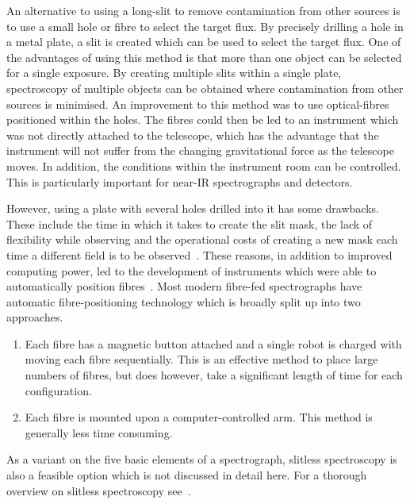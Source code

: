 An alternative to using a long-slit to remove contamination from other sources is to use a small hole or fibre to select the target flux.
By precisely drilling a hole in a metal plate, a slit is created which can be used to select the target flux.
One of the advantages of using this method is that more than one object can be selected for a single exposure.
By creating multiple slits within a single plate, spectroscopy of multiple objects can be obtained where contamination from other sources is minimised.
An improvement to this method was to use optical-fibres positioned within the holes.
The fibres could then be led to an instrument which was not directly attached to the telescope, which has the advantage that the instrument will not suffer from the changing gravitational force as the telescope moves.
In addition, the conditions within the instrument room can be controlled.
This is particularly important for near-IR spectrographs and detectors.

However, using a plate with several holes drilled into it has some drawbacks.
These include the time in which it takes to create the slit mask, the lack of flexibility while observing and the operational costs of creating a new mask each time a different field is to be observed~\citep{1986SPIE..627..118P}.
These reasons, in addition to improved computing power, led to the development of instruments which were able to automatically position fibres~\citep{1982SPIE..331..289T}.
Most modern fibre-fed spectrographs have automatic fibre-positioning technology which is broadly split up into two approaches.

\begin{enumerate}
    \item Each fibre has a magnetic button attached and a single robot is charged with moving each fibre sequentially.
    This is an effective method to place large numbers of fibres, but does however, take a significant length of time for each configuration.
    \item Each fibre is mounted upon a computer-controlled arm.
    This method is generally less time consuming.
\end{enumerate}

As a variant on the five basic elements of a spectrograph, slitless spectroscopy is also a feasible option which is not discussed in detail here.
For a thorough overview on slitless spectroscopy see~\citet{2014PhDT.........C}.

